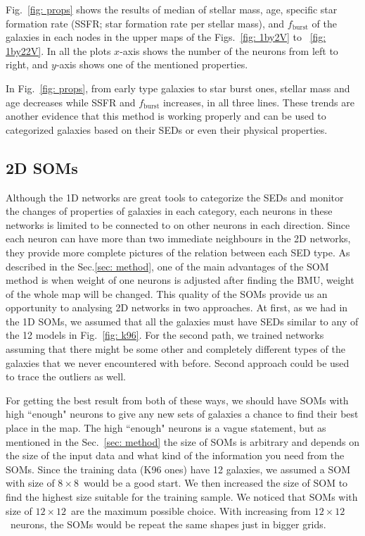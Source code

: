        Fig.~\ref{fig: props} shows the results of median of stellar mass, age, specific star formation rate (SSFR; star formation rate per stellar mass), and $f_\mathrm{burst}$ of the galaxies in each nodes in the upper maps of the Figs.~\ref{fig: 1by2V} to ~\ref{fig: 1by22V}.
        In all the plots $x$-axis shows the number of the neurons from left to right, and $y$-axis shows one of the mentioned properties.
        
        In Fig.~\ref{fig: props}, from early type galaxies to star burst ones, stellar mass and age decreases while SSFR and $f_\mathrm{burst}$ increases, in all three lines. 
        These trends are another evidence that this method is working properly and can be used to categorized galaxies based on their SEDs or even their physical properties.
        
    
    
    
    
    \subsection{2D SOMs}
    \label{sec: 2D}
    Although the 1D networks are great tools to categorize the SEDs and monitor the changes of properties of galaxies in each category, each neurons in these networks is limited to be connected to on other neurons in each direction.
    Since each neuron can have more than two immediate neighbours in the 2D networks, they provide more complete pictures of the relation between each SED type.
    As described in the Sec.\ref{sec: method}, one of the main advantages of the SOM method is when weight of one neurons is adjusted after finding the BMU, weight of the whole map will be changed.
    This quality of the SOMs provide us an opportunity to analysing 2D networks in two approaches. 
    At first, as we had in the 1D SOMs, we assumed that all the galaxies must have SEDs similar to any of the 12 models in Fig.~\ref{fig: k96}.
    For the second path, we trained networks assuming that there might be some other and completely different types of the galaxies that we never encountered with before.
    Second approach could be used to trace the outliers as well.
    
    For getting the best result from both of these ways, we should have SOMs with high ``enough"  neurons to give any new sets of galaxies a chance to find their best place in the map.
    The  high ``enough"  neurons is a vague statement, but as mentioned in the Sec.~\ref{sec: method} the size of SOMs is arbitrary and depends on the size of the input data and what kind of the information you need from the SOMs.
    Since the training data (K96 ones) have 12 galaxies, we assumed a SOM with size of $8\times8$~would be a good start.
    We then increased the size of SOM to find the highest size suitable for the training sample.
    We noticed that SOMs with size of $12\times12$~are the maximum possible choice.
    With increasing from $12\times12$~neurons, the SOMs would be repeat the same shapes just in bigger grids.
    

